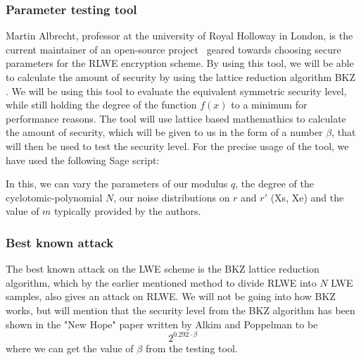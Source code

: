 \documentclass[../main.tex]{subfiles}
\begin{document}
    \subsubsection{Parameter testing tool} \label{sec:lattice-reduction}
        Martin Albrecht, professor at the university of Royal Holloway in London, is the current maintainer of an
		open-source project~\cite{estimations-tool} geared towards choosing secure parameters for the RLWE encryption scheme.
		By using this tool, we will be able to calculate the amount of security by using the lattice reduction algorithm BKZ \cite{usenix16}.
		We will be using this tool to evaluate the equivalent symmetric security level,
		while still holding the degree of the function $f(x)$ to a minimum for performance reasons.
		The tool will use lattice based mathemathics to calculate the amount of security, which will be given
		to us in the form of a number $\beta$, that will then be used to test the security level.
        For the precise usage of the tool, we have used the following Sage script:
        
        In this, we can vary the parameters of our modulus $q$, the degree of the cyclotomic-polynomial $N$,
        our noise distributions on $r$ and $r'$ (Xs, Xe) and the value of $m$ typically provided by the authors.

    \subsubsection{Best known attack}
		The best known attack on the LWE scheme is the BKZ lattice reduction algorithm, which by the earlier mentioned method to divide RLWE into $N$ LWE samples, also gives an attack on RLWE.
		We will not be going into how BKZ works, but will mention that the security level from the BKZ algorithm
		has been shown in the "New Hope" paper \cite{usenix16} written by Alkim and Poppelman to be
		\[ 2^{0.292 \cdot \beta} \]
		where we can get the value of $\beta$ from the testing tool.
\end{document}
